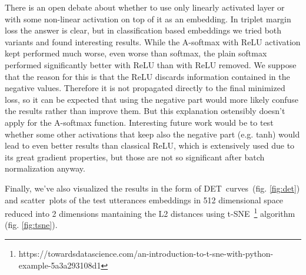 \medskip
There is an open debate about whether to use only linearly activated layer or with some non-linear activation on top of it as an embedding. In triplet margin loss the answer is clear, but in classification based embeddings we tried both variants and found interesting results. While the A-softmax with ReLU activation kept performed much worse, even worse than softmax, the plain softmax performed significantly better with ReLU than with ReLU removed. We suppose that the reason for this is that the ReLU discards information contained in the negative values. Therefore it is not propagated directly to the final minimized loss, so it can be expected that using the negative part would more likely confuse the results rather than improve them. But this explanation ostensibly doesn't apply for the A-softmax function. Interesting future work would be to test whether some other activations that keep also the negative part (e.g. tanh) would lead to even better results than classical ReLU, which is extensively used due to its great gradient properties, but those are not so significant after batch normalization anyway.

\medskip
Finally, we've also visualized the results in the form of DET~curves~(fig. \ref{fig:det}) and scatter~plots of the test utterances embeddings in 512 dimensional space reduced into 2 dimensions mantaining the L2 distances using t-SNE~\footnote{https://towardsdatascience.com/an-introduction-to-t-sne-with-python-example-5a3a293108d1} algorithm (fig. \ref{fig:tsne}).

